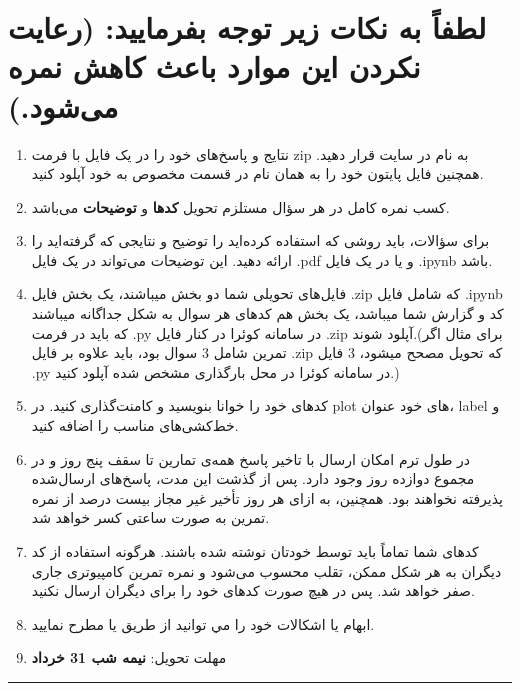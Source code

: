 \documentclass[a4paper]{article}
\begin{document}
\section*{
لطفاً به نکات زیر توجه بفرمایید: (رعایت نکردن این موارد باعث کاهش نمره می‌شود.)
}
\begin{enumerate}
	\item 
نتایج و پاسخ‌های خود را در یک فایل با فرمت zip به نام
 در سایت  
\href{https://quera.org/overview/add_to_course/course/10631}{} 
 قرار دهید. همچنین فایل پایتون خود را به همان نام در قسمت مخصوص به خود آپلود کنید.
	\item 
کسب نمره کامل در هر سؤال مستلزم تحویل  \textbf{کدها} و \textbf{توضیحات} می‌باشد. 
\item 
برای سؤالات، باید روشی که استفاده کرده‌اید را توضیح  و نتایجی که گرفته‌اید را ارائه دهید. این توضیحات می‌تواند در یک فایل  .pdf  و یا در یک فایل  .ipynb باشد. 
\item
فایل‌های تحویلی شما دو بخش میباشند، یک بخش فایل .zip که شامل فایل .ipynb کد و گزارش شما میباشد، یک بخش هم کدهای هر سوال به شکل جداگانه میباشند که باید در فرمت .py در سامانه کوئرا در کنار فایل .zip آپلود شوند.(برای مثال اگر تمرین شامل 3 سوال بود، باید علاوه بر فایل .zip که تحویل مصحح میشود، 3 فایل .py در سامانه کوئرا در محل بارگذاری مشخص شده آپلود کنید.)
\item 
کدهای خود را خوانا بنویسید و کامنت‌‌گذاری کنید. در plot های خود عنوان، label و خط‌کشی‌های مناسب را اضافه کنید.
\item
در طول ترم امکان ارسال با تاخیر پاسخ  همه‌ی تمارین تا سقف پنج روز و در مجموع دوازده روز وجود دارد. پس از گذشت این مدت، پاسخ‌های ارسال‌شده پذیرفته نخواهند بود. همچنین، به ازای هر روز تأخیر غیر مجاز  بیست درصد از نمره تمرین به صورت ساعتی کسر خواهد شد.
\item
کدهای شما تماماً باید توسط خودتان نوشته شده باشند. هرگونه استفاده از کد دیگران به هر شکل ممکن، تقلب محسوب می‌شود و نمره تمرین کامپیوتری جاری صفر خواهد شد. پس در هیچ صورت کدهای خود را برای دیگران ارسال نکنید.
\item 
ابهام يا اشكالات خود را مي توانيد  از طریق
\href{mailto:smmzdr@gmail.com}{}
یا 
\href{mailto:javadiamirhosein.2000@gmail.com}{}
مطرح نمایید.
\item 
مهلت تحویل:  
\textbf{نیمه شب 31 خرداد}
\end{enumerate}
\rule[0.1\baselineskip]{\textwidth}{1.5pt}

\clearpage
\end{document}
